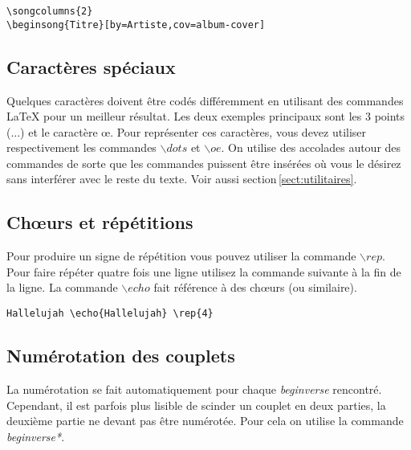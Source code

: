 \documentclass[a4paper]{article}
\begin{document}
\begin{verbatim}
\songcolumns{2}
\beginsong{Titre}[by=Artiste,cov=album-cover]
\end{verbatim}

\subsection{Caractères spéciaux}

Quelques caractères doivent être codés différemment en utilisant des
commandes LaTeX pour un meilleur résultat. Les deux exemples
principaux sont les 3 points (...) et le caractère \oe{}. Pour
représenter ces caractères, vous devez utiliser respectivement les
commandes ${\backslash dots}$ et ${\backslash oe}$. On utilise des
accolades autour des commandes de sorte que les commandes puissent
être insérées où vous le désirez sans interférer avec le reste du
texte. Voir aussi section\,\ref{sect:utilitaires}.

\subsection{Ch\oe{}urs et répétitions}

Pour produire un signe de répétition vous pouvez utiliser la commande
$\backslash rep$. Pour faire répéter quatre fois une ligne utilisez la
commande suivante à la fin de la ligne. La commande $\backslash echo$
fait référence à des ch\oe{}urs (ou similaire).

\begin{verbatim}
Hallelujah \echo{Hallelujah} \rep{4}
\end{verbatim}

\subsection{Numérotation des couplets}

La numérotation se fait automatiquement pour chaque \emph{beginverse}
rencontré. Cependant, il est parfois plus lisible de scinder un
couplet en deux parties, la deuxième partie ne devant pas être
numérotée. Pour cela on utilise la commande \emph{beginverse*}.
 
\end{document}
